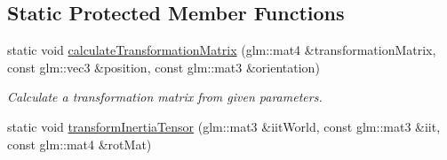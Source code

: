 \subsection*{Static Protected Member Functions}
\begin{DoxyCompactItemize}
\item 
static void \mbox{\hyperlink{classr3_1_1_rigid_body_ac2a67d810e9923dc125a0300c718a97a}{calculate\+Transformation\+Matrix}} (glm\+::mat4 \&transformation\+Matrix, const glm\+::vec3 \&position, const glm\+::mat3 \&orientation)
\begin{DoxyCompactList}\small\item\em Calculate a transformation matrix from given parameters. \end{DoxyCompactList}\item 
static void \mbox{\hyperlink{classr3_1_1_rigid_body_a59d331a52a0110415b38bfa89cf0f804}{transform\+Inertia\+Tensor}} (glm\+::mat3 \&iit\+World, const glm\+::mat3 \&iit, const glm\+::mat4 \&rot\+Mat)
\end{DoxyCompactItemize}
